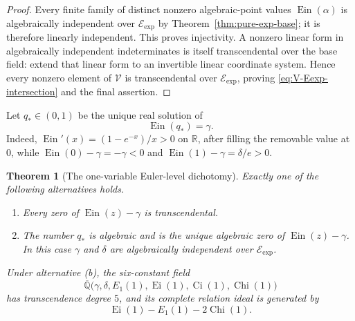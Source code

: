 \documentclass[11pt]{article}
\newtheorem{theorem}{Theorem}[section]
\theoremstyle{definition}
\theoremstyle{remark}
\newcommand{\Qbar}{\overline{\mathbb Q}}
\newcommand{\Ein}{\operatorname{Ein}}
\newcommand{\Ei}{\operatorname{Ei}}
\newcommand{\Ci}{\operatorname{Ci}}
\newcommand{\Chi}{\operatorname{Chi}}
\newcommand{\Eexp}{\mathcal E_{\mathrm{exp}}}
\begin{document}
\begin{proof}
Every finite family of distinct nonzero algebraic-point values
\(\Ein(\alpha)\) is algebraically independent over \(\Eexp\) by
Theorem~\ref{thm:pure-exp-base}; it is therefore linearly independent.
This proves injectivity.  A nonzero linear form in algebraically independent
indeterminates is itself transcendental over the base field: extend that
linear form to an invertible linear coordinate system.  Hence every nonzero
element of \(\mathscr V\) is transcendental over \(\Eexp\), proving
\eqref{eq:V-Eexp-intersection} and the final assertion.
\end{proof}

Let \(q_*\in(0,1)\) be the unique real solution of
\begin{equation}\label{eq:qstar-ein-level}
 \Ein(q_*)=\gamma.
\end{equation}
Indeed, \(\Ein'(x)=(1-e^{-x})/x>0\) on \(\mathbb R\), after filling the
removable value at \(0\), while
\(\Ein(0)-\gamma=-\gamma<0\) and
\(\Ein(1)-\gamma=\delta/e>0\).

\begin{theorem}[The one-variable Euler-level dichotomy]
\label{thm:qstar-algebraic-dichotomy}
Exactly one of the following alternatives holds.
\begin{enumerate}[label=\textup{(\alph*)}]
 \item Every zero of \(\Ein(z)-\gamma\) is transcendental.
 \item The number \(q_*\) is algebraic and is the unique algebraic zero of
       \(\Ein(z)-\gamma\).  In this case \(\gamma\) and \(\delta\) are
       algebraically independent over \(\Eexp\).
\end{enumerate}
Under alternative \textup{(b)}, the six-constant field
\[
 \Qbar\bigl(\gamma,\delta,E_1(1),\Ei(1),\Ci(1),\Chi(1)\bigr)
\]
has transcendence degree \(5\), and its complete relation ideal is
generated by
\begin{equation}\label{eq:qstar-six-relation}
 \Ei(1)-E_1(1)-2\Chi(1).
\end{equation}
\end{theorem}
\end{document}
